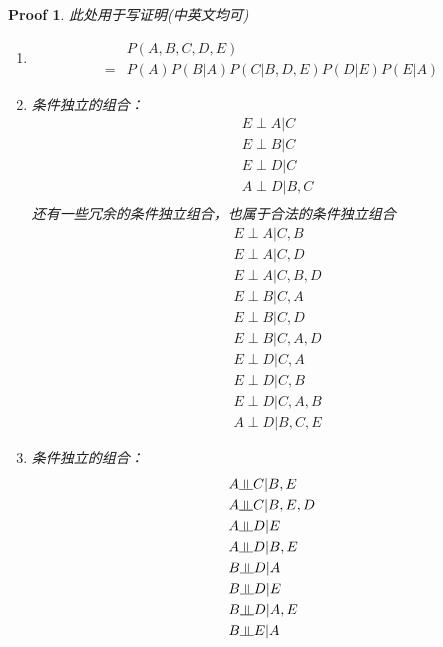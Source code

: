 \documentclass[a4paper,UTF8]{article}
\numberwithin{equation}{section}
\newtheorem*{myProof}{Proof}
\newcommand{\indep}{\rotatebox[origin=c]{90}{$\models$}}
\begin{document}
\begin{myProof}
	此处用于写证明(中英文均可)
	~\\
\begin{enumerate}[(1)]
\item 
\begin{equation}
\begin{aligned}
&P(A,B,C,D,E)\\ 
=& P(A)P(B|A)P(C|B,D,E)P(D|E)P(E|A)
\end{aligned}
\end{equation}
\item 
条件独立的组合：\\
\begin{equation}
\begin{aligned}
&E \perp A | C\\
&E \perp B | C\\
&E \perp D | C\\
&A \perp D | B, C\\
\end{aligned}
\end{equation}
还有一些冗余的条件独立组合，也属于合法的条件独立组合
\begin{equation}
\begin{aligned}
&E \perp A | C, B\\
&E \perp A | C, D\\
&E \perp A | C, B, D\\
&E \perp B | C, A\\
&E \perp B | C, D\\
&E \perp B | C, A, D\\
&E \perp D | C, A\\
&E \perp D | C, B\\
&E \perp D | C, A, B\\
&A \perp D | B, C, E
\end{aligned}
\end{equation}
\item 
条件独立的组合：\\
\begin{equation}
\begin{aligned}
&A \indep C | B,E\\
&A \indep C | B,E,D\\
&A \indep D | E\\
&A \indep D | B,E\\
&B \indep D | A\\
&B \indep D | E\\
&B \indep D | A,E\\
&B \indep E | A\\

\end{aligned}
\end{equation}
\end{enumerate}
\end{myProof}
\end{document}
